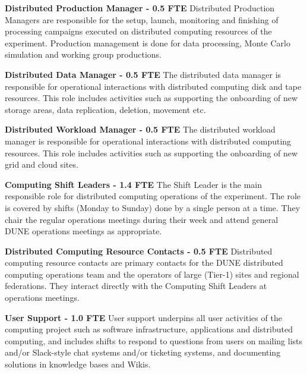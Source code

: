 \begin{description}
\item {\bf Distributed Production Manager - 0.5 FTE}
Distributed Production Managers are responsible for the setup, launch, monitoring and finishing of processing campaigns executed on distributed computing resources of the experiment. Production management is done for data processing, Monte Carlo simulation and working group productions.%

\item {\bf Distributed Data Manager - 0.5 FTE}
The distributed data manager is responsible for operational interactions with distributed computing disk and tape resources. This role includes activities such as supporting the onboarding of new storage areas, data replication, deletion, movement etc. %

\item {\bf Distributed Workload Manager - 0.5 FTE}
The distributed workload manager is responsible for operational interactions with distributed computing resources. This role includes activities such as supporting the onboarding of new grid and cloud sites. %



\item {\bf Computing Shift Leaders - 1.4 FTE}
The Shift Leader is the main responsible role for distributed computing operations of the experiment. The role is covered by shifts (Monday to Sunday) done by a single person at a time.  They chair the regular operations meetings during their week and attend general DUNE operations meetings as appropriate. %

\item {\bf Distributed Computing Resource Contacts - 0.5 FTE}
Distributed computing resource contacts are primary contacts for the DUNE distributed computing operations team and the operators of large (Tier-1) sites and regional federations. They interact directly with the Computing Shift Leaders at operations meetings. %

\item {\bf User Support - 1.0 FTE}
User support underpins all user activities of the computing project such as software infrastructure, applications and distributed computing, and includes shifts to respond to questions from users on mailing lists and/or Slack-style chat systems and/or ticketing systems, and documenting solutions in knowledge bases and Wikis.%


\end{description}
